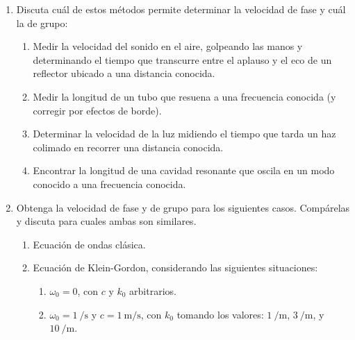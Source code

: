 \documentclass[11pt,spanish]{article}
\begin{document}
\begin{enumerate}

\section*{Velocidad de grupo y de fase}


    \item Discuta cuál de estos métodos permite determinar
    la velocidad de fase y cuál la de grupo:

    \begin{enumerate}
        \item Medir la velocidad del sonido en el aire, golpeando las manos y
        determinando el tiempo que transcurre entre el aplauso y el eco de un
        reflector ubicado a una distancia conocida.

        \item Medir la longitud de un tubo que resuena a una frecuencia conocida
        (y corregir por efectos de borde).

        \item Determinar la velocidad de la luz midiendo el tiempo que tarda un
        haz colimado en recorrer una distancia conocida.

        \item Encontrar la longitud de una cavidad resonante que oscila en un
        modo conocido a una frecuencia conocida.
    \end{enumerate}


    \item Obtenga la velocidad de fase y de grupo para los siguientes casos.
    Compárelas y discuta para cuales ambas son similares.
    
    \begin{enumerate}
        \item Ecuación de ondas clásica.
        \item Ecuación de Klein-Gordon, considerando las siguientes situaciones:
        \begin{enumerate}
            \item $\omega_0 = 0$, con $c$ y $k_0$ arbitrarios.

            \item $\omega_0 = \SI{1}{\per\second}$ y $c=\SI{1}{\meter\per\second}$,
            con $k_0$ tomando los valores: $\SI{1}{\per\meter}$,
            $\SI{3}{\per\meter}$, y $\SI{10}{\per\meter}$.
        \end{enumerate}
    \end{enumerate}


\end{enumerate}
\end{document}
